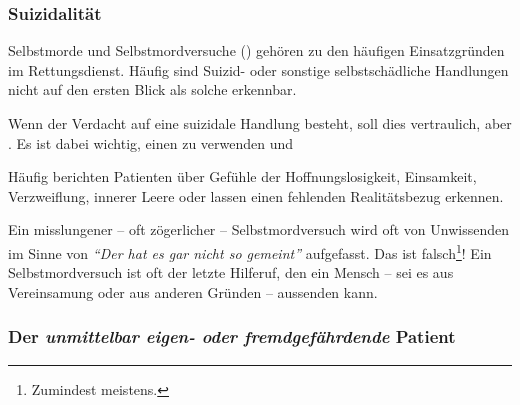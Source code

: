 \subsubsection{Suizidalität}


Selbstmorde und Selbstmordversuche () gehören zu den
häufigen Einsatzgründen im Rettungsdienst. Häufig sind
Suizid- oder sonstige selbstschädliche Handlungen nicht auf
den ersten Blick als solche erkennbar. 

Wenn der Verdacht auf eine suizidale Handlung besteht, soll
dies vertraulich, aber . Es ist dabei wichtig, einen 
zu verwenden und 

\begin{quotation}

\end{quotation}

Häufig berichten Patienten über Gefühle der
Hoffnungslosigkeit, Einsamkeit, Verzweiflung, innerer Leere
oder lassen einen fehlenden Realitätsbezug erkennen.


Ein misslungener -- oft zögerlicher -- Selbstmordversuch
wird oft von Unwissenden im Sinne von \emph{"`Der hat es gar nicht so gemeint"'}
aufgefasst. Das ist falsch\footnote{Zumindest meistens.}!
Ein Selbstmordversuch ist oft der letzte Hilferuf, den ein
Mensch -- sei es aus Vereinsamung oder aus anderen Gründen
-- aussenden kann. 



\subsubsection{Der \emph{unmittelbar eigen- oder
fremdgefährdende} Patient}

